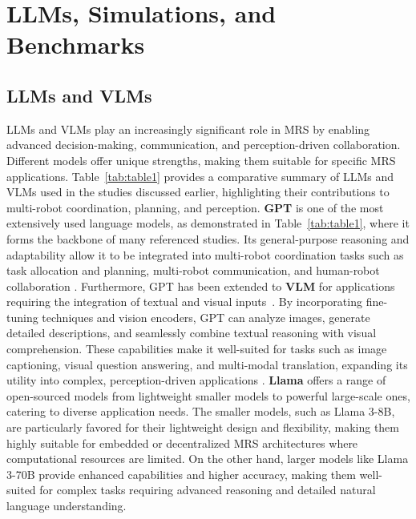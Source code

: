 \section{LLMs, Simulations, and Benchmarks}\label{sec:6-benchmark}

\subsection{LLMs and VLMs} 
LLMs and VLMs play an increasingly significant role in MRS by enabling advanced decision-making, communication, and perception-driven collaboration. Different models offer unique strengths, making them suitable for specific MRS applications. Table~\ref{tab:table1} provides a comparative summary of LLMs and VLMs used in the studies discussed earlier, highlighting their contributions to multi-robot coordination, planning, and perception.
\textbf{GPT} is one of the most extensively used language models, as demonstrated in Table~\ref{tab:table1}, where it forms the backbone of many referenced studies. Its general-purpose reasoning and adaptability allow it to be integrated into multi-robot coordination tasks such as task allocation and planning, multi-robot communication, and human-robot collaboration \cite{wu_hierarchical_2024, huang2024words, liu_coherent_2024, lakhnati_exploring_2024,hunt2024conversational}. Furthermore, GPT has been extended to \textbf{VLM} for applications requiring the integration of textual and visual inputs~\cite{garg_foundation_2024, brienza_llcoach_2024, sueoka_adaptivity_nodate}. By incorporating fine-tuning techniques and vision encoders, GPT can analyze images, generate detailed descriptions, and seamlessly combine textual reasoning with visual comprehension. These capabilities make it well-suited for tasks such as image captioning, visual question answering, and multi-modal translation, expanding its utility into complex, perception-driven applications \cite{brienza_llcoach_2024, sueoka_adaptivity_nodate, garg_foundation_2024, venkatesh_zerocap_2024}.
\textbf{Llama} offers a range of open-sourced models from lightweight smaller models to powerful large-scale ones, catering to diverse application needs. The smaller models, such as Llama 3-8B, are particularly favored for their lightweight design and flexibility, making them highly suitable for embedded or decentralized MRS architectures where computational resources are limited. On the other hand, larger models like Llama 3-70B provide enhanced capabilities and higher accuracy, making them well-suited for complex tasks requiring advanced reasoning and detailed natural language understanding.
